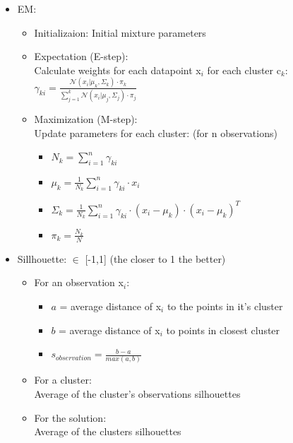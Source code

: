 \documentclass[twocolumn, 10pt]{article}
\begin{document}
\begin{itemize}[leftmargin=*, itemsep=0pt]
    \item EM:
    \begin{itemize}[topsep=0pt]
        \item Initializaion: Initial mixture parameters
        \item Expectation (E-step): \\[2pt]
        Calculate weights for each datapoint x$_i$ for each cluster c$_k$: 
        $\displaystyle \gamma_{ki}=\frac{\mathcal{N}(x_i|\mu_k,\Sigma_k)\cdot\pi_k}{\sum_{j = 1}^{k}\mathcal{N}(x_{i}|\mu_{j},\Sigma_{j})\cdot\pi_{j}}$
        \item Maximization (M-step): \\[2pt]
        Update parameters for each cluster: (for n observations)
        \begin{itemize}
            \item $\displaystyle N_{k}={\sum_{i=1}^{n}\gamma_{ki}}$
            \item $\displaystyle \mu_{k}={\frac{1}{N_{k}}\sum_{i=1}^{n}\gamma_{ki}\cdot x_{i}}$
            \item $\displaystyle \Sigma_{k} = \frac{1}{N_{k}}\sum_{i=1}^{n}\gamma_{ki} \cdot (x_{i} - \mu_{k}) \cdot (x_{i} - \mu_{k})^T$
            \item $\displaystyle \pi_{k}={\frac{N_{k}}{N}}$
        \end{itemize}
    \end{itemize}

    \item Sillhouette: $\in$ [-1,1] (the closer to 1 the better)
    \begin{itemize}[topsep=0pt, itemsep=0pt]
        \item For an observation x$_i$:
        \begin{itemize}[topsep=0pt, itemsep=0pt]
            \item $a$ = average distance of x$_i$ to the points in it's cluster
            \item $b$ = average distance of x$_i$ to points in closest cluster
            \item $\displaystyle s_{observation}=\frac{b-a}{max(a,b)}$
        \end{itemize}
        \item For a cluster: \\[2pt]
        Average of the cluster's observations silhouettes
        \item For the solution: \\[2pt]
        Average of the clusters silhouettes
    \end{itemize}

\end{itemize}
\end{document}
